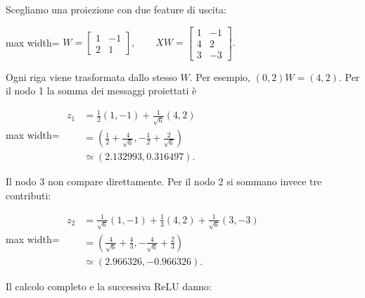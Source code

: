 \documentclass[11pt,a4paper,oneside,openany]{book}
\begin{document}
Scegliamo una proiezione con due feature di uscita:

\begin{center}
\begin{adjustbox}{max width=\linewidth}
$\displaystyle W=\begin{bmatrix}1&-1\\2&1\end{bmatrix},\qquad
XW=\begin{bmatrix}1&-1\\4&2\\3&-3\end{bmatrix}.$
\end{adjustbox}
\end{center}

Ogni riga viene trasformata dallo stesso \(W\). Per esempio, \((0,2)W=(4,2)\). Per il nodo 1 la somma dei messaggi proiettati è

\begin{center}
\begin{adjustbox}{max width=\linewidth}
$\displaystyle \begin{aligned}
z_1&=\frac12(1,-1)+\frac1{\sqrt6}(4,2)\\
&=\left(\frac12+\frac4{\sqrt6},-\frac12+\frac2{\sqrt6}\right)\\
&\simeq(2.132993,0.316497).
\end{aligned}$
\end{adjustbox}
\end{center}

Il nodo 3 non compare direttamente. Per il nodo 2 si sommano invece tre contributi:

\begin{center}
\begin{adjustbox}{max width=\linewidth}
$\displaystyle \begin{aligned}
z_2&=\frac1{\sqrt6}(1,-1)+\frac13(4,2)+\frac1{\sqrt6}(3,-3)\\
&=\left(\frac4{\sqrt6}+\frac43,-\frac4{\sqrt6}+\frac23\right)\\
&\simeq(2.966326,-0.966326).
\end{aligned}$
\end{adjustbox}
\end{center}

Il calcolo completo e la successiva ReLU danno:
\end{document}
